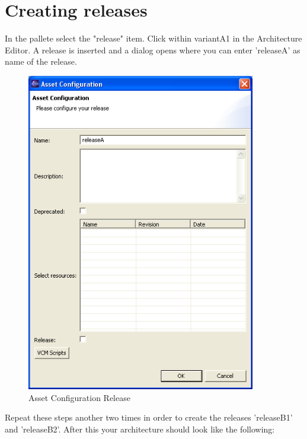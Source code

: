 \section{Creating releases}

In the pallete select the "release" item. Click within variantA1 in 
the Architecture Editor. A release is inserted and a dialog opens where you can enter 'releaseA' as name of
the release. 

\begin{figure}[h!]
\begin{center}
\includegraphics[width=10cm]{tutorial11.png}
   \caption{Asset Configuration Release}
\end{center}
\end{figure}\par

Repeat these steps another two times in order to create the releases 'releaseB1' and 
'releaseB2'. After this your architecture should look like the following:

